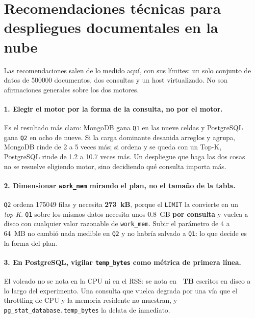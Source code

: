 
\section{Recomendaciones técnicas para despliegues documentales en la nube}
\label{sec:recomendaciones}

Las recomendaciones salen de lo medido aquí, con sus límites: un solo conjunto de
datos de \num{500000} documentos, dos consultas y un host virtualizado. No son
afirmaciones generales sobre los dos motores.

\paragraph{1. Elegir el motor por la forma de la consulta, no por el motor.}
Es el resultado más claro: MongoDB gana \texttt{Q1} en las nueve celdas y
PostgreSQL gana \texttt{Q2} en ocho de nueve. Si la carga dominante desanida
arreglos y agrupa, MongoDB rinde de 2 a 5 veces más; si ordena y se queda con un
Top-K, PostgreSQL rinde de 1.2 a 10.7 veces más. Un despliegue que haga las dos
cosas no se resuelve eligiendo motor, sino decidiendo qué consulta importa más.

\paragraph{2. Dimensionar \texttt{work\_mem} mirando el plan, no el tamaño de la tabla.}
\texttt{Q2} ordena \num{175049} filas y necesita \textbf{273~kB}, porque el
\texttt{LIMIT} la convierte en un \emph{top-K}. \texttt{Q1} sobre los mismos datos
necesita unos 0.8~GB \textbf{por consulta} y vuelca a disco con cualquier valor
razonable de \texttt{work\_mem}. Subir el parámetro de 4 a 64~MB no cambió nada
medible en \texttt{Q2} y no habría salvado a \texttt{Q1}: lo que decide es la forma
del plan.

\paragraph{3. En PostgreSQL, vigilar \texttt{temp\_bytes} como métrica de primera línea.}
El volcado no se nota en la CPU ni en el RSS: se nota en \textbf{\cifraTempTotalTB{}~TB}
escritos en disco a lo largo del experimento. Una consulta que vuelca degrada por
una vía que el throttling de CPU y la memoria residente no muestran, y
\texttt{pg\_stat\_database.temp\_bytes} la delata de inmediato.

